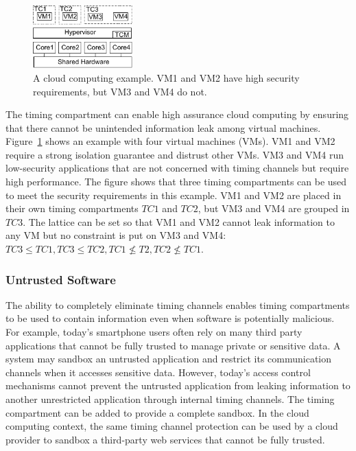 \begin{figure}
    \begin{center}
        \includegraphics[width=1.51in]{figs/cloud_tcs.pdf}
        \caption{A cloud computing example. VM1 
        and VM2 have high security requirements, but VM3 and VM4 do not.}
        \label{fig:cloud_tcs}
    \end{center}
\end{figure}

The timing compartment can enable high assurance cloud computing by ensuring that
there cannot be unintended information leak among virtual machines.
Figure~\ref{fig:cloud_tcs} shows an example with four virtual machines (VMs).
VM1 and VM2 require a strong isolation guarantee and distrust other VMs.
VM3 and VM4 run low-security applications that are not concerned with timing channels
but require high performance. The figure shows that three timing compartments can
be used to meet the security requirements in this example.
VM1 and VM2 are placed in their own timing compartments $TC1$ and $TC2$, but 
VM3 and VM4 are grouped in $TC3$. The lattice can be set so that VM1 and VM2
cannot leak information to any VM but no constraint is put on VM3 and VM4:
$TC3 \leq TC1, TC3 \leq TC2, TC1 \nleq T2, TC2 \nleq TC1$.


\subsubsection{Untrusted Software} 

The ability to completely eliminate timing channels enables timing compartments
to be used to contain information even when software is potentially malicious.
For example, today's smartphone users often rely on many third party applications
that cannot be fully trusted to manage private or sensitive data. A system may
sandbox an untrusted application and restrict its communication channels
when it accesses sensitive data. However, today's access control mechanisms cannot
prevent the untrusted application from leaking information to another unrestricted
application through internal timing channels. The timing compartment can be added 
to provide a complete sandbox. 
In the cloud computing context, the same timing channel protection can be used
by a cloud provider to sandbox a third-party web services that cannot be fully trusted.

